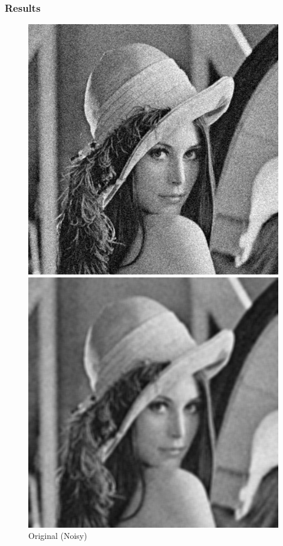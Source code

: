 \documentclass[11pt,a4paper]{article}
\begin{document}
\subsubsection*{Results}
\begin{figure}[ht!]
    \centering
    \begin{minipage}{0.3\textwidth}
        \centering
        \includegraphics[width=\linewidth]{figs/lenna_noisy.png}
        \caption{Original (Noisy)}
    \end{minipage}
    \quad
    \begin{minipage}{0.3\textwidth}
        \centering
        \includegraphics[width=\linewidth]{figs/task1/box_filtered.png}

\end{minipage}
\end{figure}
\end{document}
